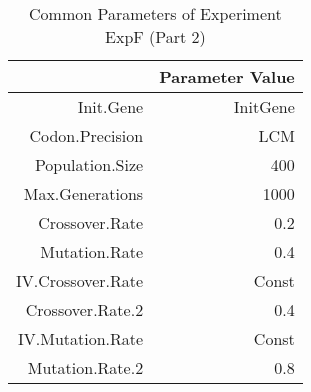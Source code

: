\begin{table}[ht]
\centering
\begin{tabular}{rr}
  \hline
 & Parameter Value \\ 
  \hline
Init.Gene & InitGene \\ 
  Codon.Precision & LCM \\ 
  Population.Size & 400 \\ 
  Max.Generations & 1000 \\ 
  Crossover.Rate & 0.2 \\ 
  Mutation.Rate & 0.4 \\ 
  IV.Crossover.Rate & Const \\ 
  Crossover.Rate.2 & 0.4 \\ 
  IV.Mutation.Rate & Const \\ 
  Mutation.Rate.2 & 0.8 \\ 
   \hline
\end{tabular}
\caption{Common Parameters of Experiment ExpF (Part 2)} 
\end{table}
